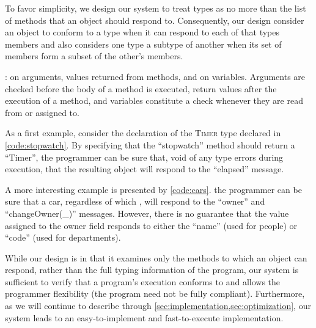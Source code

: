 To favor simplicity,
we design our system to treat types as no more than the list of methods that an object should respond to.
Consequently, our design consider an object to 
conform to a type when it can respond to each of that types members and
also considers one type a subtype of another 
when its set of members form a subset of the other's members.

: 
on arguments, values returned from methods, and on variables.
Arguments are checked before the body of a method is executed,
return values after the execution of a method, and
variables constitute a check whenever they are read from or assigned to.

As a first example, 
consider the declaration of the \textsc{Timer} type declared in \cref{code:stopwatch}. 
By specifying that the ``stopwatch'' method should return a ``Timer'', 
the programmer can be sure that, void of any type errors during execution,
that the resulting object will respond to the ``elapsed'' message.



A more interesting example is presented by \cref{code:cars}. 
 the programmer can be sure that a car, 
regardless of which , 
will respond to the ``owner'' and ``changeOwner(\_)'' messages.
However, there is no guarantee that the value assigned to the owner field responds to
either the ``name'' (used for people) or ``code'' (used for departments). 



While our design is  in that it examines only the methods to which an object can respond,
rather than the full typing information of the program,
our system is sufficient to verify that a program's execution conforms to 
and allows the programmer flexibility (the program need not be fully compliant).
Furthermore, as we will continue to describe through \cref{sec:implementation,sec:optimization}, 
our system leads to an easy-to-implement and fast-to-execute implementation.


